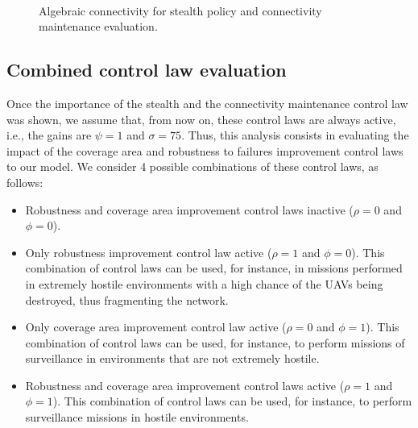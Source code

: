 \begin{figure}[hbt!]
      \centering            
         \\ \centering
      \caption{Algebraic connectivity for stealth policy and connectivity maintenance evaluation.}
      \label{fig:unstructuredLambdaRadarOnConnectivity}
\end{figure}

\subsection{Combined control law evaluation}

Once the importance of the stealth and the connectivity maintenance control law was shown, we assume that, from now on, these control laws are always active, i.e., the gains are $\psi=1$ and $\sigma=75$. Thus, this analysis consists in evaluating the impact of the coverage area and robustness to failures improvement control laws to our model. We consider 4 possible combinations of these control laws, as follows:

\begin{itemize}
    \item Robustness and coverage area improvement control laws inactive ($\rho=0$ and $\phi=0$). 
    \item Only robustness improvement control law active ($\rho=1$ and $\phi=0$). This combination of control laws can be used, for instance, in missions performed in extremely hostile environments with a high chance of the UAVs being destroyed, thus fragmenting the network.
    \item Only coverage area improvement control law active ($\rho=0$ and $\phi=1$). This combination of control laws can be used, for instance, to perform missions of surveillance in environments that are not extremely hostile.
    \item Robustness and coverage area improvement control laws active ($\rho=1$ and $\phi=1$). This combination of control laws can be used, for instance, to perform surveillance missions in hostile environments.
\end{itemize}

